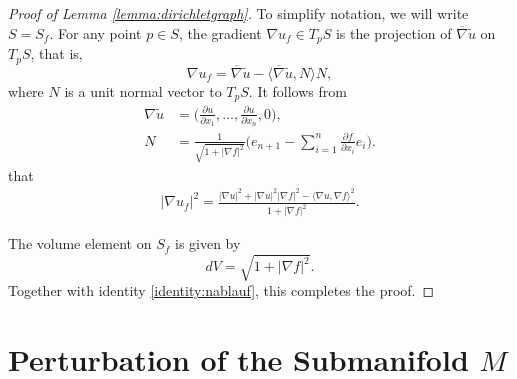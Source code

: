\documentclass{CUP-JNL-FMP}%
\theoremstyle{definition}
\numberwithin{equation}{section}
\begin{document}
\begin{proof}[Proof of Lemma \ref{lemma:dirichletgraph}]
	To simplify notation, we will write $S=S_f$.
	For any point $p\in S$, the gradient $\nabla u_f\in T_pS$ is the projection of $\overline{\nabla}\widetilde{u}$ on $T_pS$,
	that is,
	\begin{equation*}
	\nabla u_f = \overline{\nabla} \widetilde{u} -
\langle {\overline{\nabla} \widetilde{u}}, {N} \rangle N,
	\end{equation*}
	where $N$ is a unit normal vector to $T_pS$.
	It follows from
	\begin{align*}
	\nabla\widetilde{u} &= \Big(\frac{\partial u}{\partial x_1}, \dots, \frac{\partial u}
	{\partial x_n}, 0\Big),
	\\%
	N &=\frac{1}{\sqrt{1 + |\nabla f|^2}}\Big(e_{n+1}-\sum_{i=1}^n\frac{\partial f}{\partial x_i}e_i\Big).
	\end{align*}
	that
	\begin{gather}\label{identity:nablauf}
	|\nabla u_f|^2
	= \frac{|\nabla u|^2 + |\nabla u|^2|\nabla f|^2
		- \langle {\nabla u}, {\nabla f} \rangle^2}{1 + |\nabla f|^2}.
	\end{gather}
	
	The volume element on $S_f$ is given by
	\begin{equation}
	dV %
	= \sqrt{1 + |\nabla f|^2}.
	\end{equation}
	Together with identity \eqref{identity:nablauf}, this completes the proof.
\end{proof}


\section{Perturbation of the Submanifold $M$}\label{section:perturbation}
\end{document}
